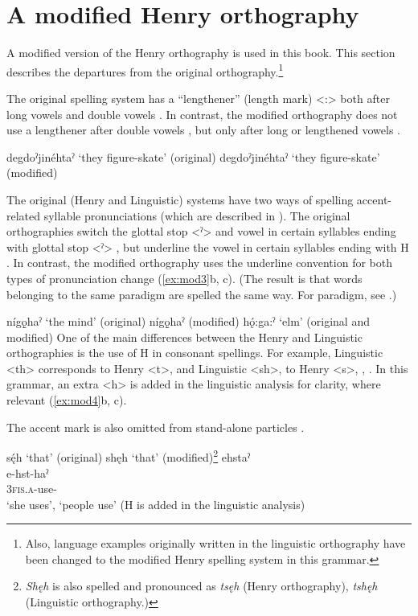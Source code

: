 \section{A modified Henry orthography} \label{A modified Henry orthography}
A modified version of the Henry orthography is used in this book. This section describes the departures from the original orthography.\footnote{Also, language examples originally written in the linguistic orthography have been changed to the modified Henry spelling system in this grammar.} 

The original spelling system has a “lengthener” (length mark) <:> both after long vowels and double vowels . In contrast, the modified orthography does not use a lengthener after double vowels , but only after long or lengthened vowels .

\ea\label{ex:mod2} 
\ea\label{ex:mod2a} degdoˀjinéhtaˀ ‘they figure-skate’ (original)
\ex\label{ex:mod2b} degdoˀjinéhtaˀ ‘they figure-skate’ (modified)
\z
\z

The original (Henry and Linguistic) systems have two ways of spelling accent-related syllable pronunciations (which are described in \pageref{ch:Pronunciation changes in sentences}). The original orthographies switch the glottal stop <ˀ> and vowel in certain syllables ending with glottal stop <ˀ> , but underline the vowel in certain syllables ending with H . In contrast, the modified orthography uses the underline convention for both types of pronunciation change (\ref{ex:mod3}b, c). (The result is that words belonging to the same paradigm are spelled the same way. For paradigm, see \pageref{Paradigm, inflection, and conjugation}.)

\ea\label{ex:mod3} 
\ea\label{ex:mod3a}nígǫ̱haˀ ‘the mind’ (original)
\ex\label{ex:mod3b}nígǫ̱haˀ (modified)
\ex\label{ex:mod3c}hǫ́:ga:ˀ ‘elm’ (original and modified)
\z
\z
One of the main differences between the Henry and Linguistic orthographies is the use of H in consonant spellings. For example, Linguistic <th> corresponds to Henry <t>, and Linguistic <sh>, to Henry <s>, , . In this grammar, an extra <h> is added in the linguistic analysis for clarity, where relevant (\ref{ex:mod4}b, c). 

The accent mark is also omitted from stand-alone particles . 

\ea\label{ex:mod4}
\ea\label{ex:mod4a} sę́h ‘that’ (original)
\ex\label{ex:mod4b} shęh ‘that’ (modified)\footnote{\textit{Shęh} is also spelled and pronounced as \textit{tsęh} (Henry orthography), \textit{tshęh} (Linguistic orthography.)}
\ex\label{ex:mod4c} ehstaˀ \\
\gll e-hst-haˀ\\
\textsc{3fis.a}-use-{\habitual}\\
\glt ‘she uses’, ‘people use’ (H is added in the linguistic analysis)
\z
\z 




